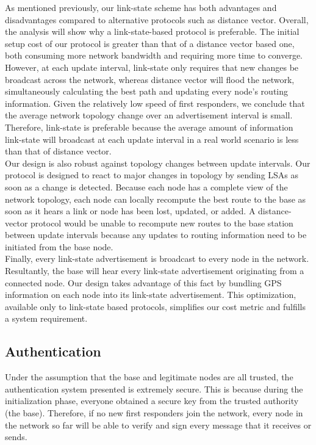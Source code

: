 \documentclass[letterpaper]{article}
\begin{document}
As mentioned previously, our link-state scheme has both advantages and disadvantages compared to alternative protocols
such as distance vector. Overall, the analysis will show why a link-state-based protocol is preferable. The initial
setup cost of our protocol is greater than that of a distance vector based one, both consuming more network bandwidth
and requiring more time to converge. However, at each update interval, link-state only requires that new changes
be broadcast across the network, whereas distance vector will flood the network, simultaneously calculating the 
best path and updating every node's routing information. Given the relatively low speed of first responders, we 
conclude that the average network topology change over an advertisement interval is small. Therefore, link-state is
preferable because the average amount of information link-state will broadcast at each update interval in a real world
scenario is less than that of distance vector.
\\

\noindent Our design is also robust against topology changes between update intervals. Our protocol is designed to react
to major changes in topology by sending LSAs as soon as a change is detected. Because each node has a complete view of 
the network topology, each node can locally recompute the best route to the base as soon as it hears a link or node has 
been lost, updated, or added. A distance-vector protocol would be unable to recompute new routes to the base station
between update intervals because any updates to routing information need to be initiated from the base node.
\\

\noindent Finally, every link-state advertisement is broadcast to every node in the network. Resultantly, the base
will hear every link-state advertisement originating from a connected node. Our design takes advantage of this fact by
bundling GPS information on each node into its link-state advertisement. This optimization, available only to link-state
based protocols, simplifies our cost metric and fulfills a system requirement. 

\subsection{Authentication}
Under the assumption that the base and legitimate nodes are all trusted, the authentication system presented is extremely secure. This is because during the initialization phase, everyone obtained a secure key from the trusted authority (the base). Therefore, if no new first responders join the network, every node in the network so far will be able to verify and sign every message that it receives or sends. \\
\end{document}
